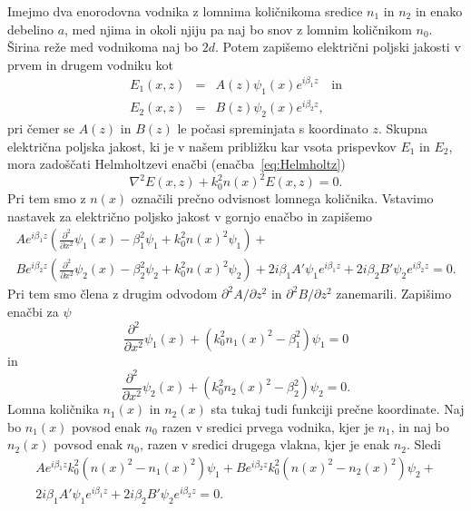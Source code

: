 Imejmo dva enorodovna vodnika z lomnima količnikoma sredice $n_1$ in $n_2$ in enako 
debelino $a$, med njima in okoli njiju pa naj bo snov z lomnim količnikom $n_0$. Širina 
reže med vodnikoma naj bo $2d$.
Potem zapišemo električni poljski jakosti v prvem in drugem vodniku kot
\begin{eqnarray}
E_1(x,z) &=& A(z) \psi_1(x) e^{i \beta_1 z} \quad \mathrm{in}\\
E_2(x,z) &=& B(z) \psi_2(x) e^{i \beta_2 z},
\label{eq:10_ampl}
\end{eqnarray}
pri čemer se $A(z)$ in $B(z)$ le počasi spreminjata s koordinato $z$. Skupna električna poljska
jakost, ki je v našem približku kar vsota prispevkov $E_1$ in $E_2$, 
mora zadoščati Helmholtzevi enačbi
(enačba~\ref{eq:Helmholtz})
\begin{equation}
\nabla^{2}E(x,z)+k_0^{2}n(x)^2 E(x,z) =0.
\end{equation}
Pri tem smo z $n(x)$ označili prečno odvisnost lomnega količnika.
Vstavimo nastavek za električno poljsko jakost v gornjo enačbo in zapišemo
\begin{multline}
A e^{i \beta_1 z}\left(\frac{\partial^2}{\partial x^2}\psi_1(x) - \beta_1^2\psi_1 + k_0^2
n(x)^2 \psi_1 \right)
+ \\
B e^{i \beta_2 z}\left(\frac{\partial^2}{\partial x^2}\psi_2(x) - \beta_2^2\psi_2 + k_0^2
n(x)^2 \psi_2 \right)+ 2 i \beta_1 A' \psi_1 e^{i \beta_1 z}+
2 i \beta_2 B' \psi_2 e^{i \beta_2 z} = 0.
\end{multline}
Pri tem smo člena z drugim odvodom $\partial^2 A/\partial z^2$ in $\partial^2 B/\partial z^2$
zanemarili. Zapišimo enačbi za $\psi$
\begin{equation}
\frac{\partial^2}{\partial x^2}\psi_1(x) + \left(k_0^2n_1(x)^2-\beta_1^2\right) \psi_1 =0
\end{equation}
in
\begin{equation}
 \frac{\partial^2}{\partial x^2}\psi_2(x) + \left(k_0^2n_2(x)^2-\beta_2^2\right) \psi_2 =0.
\end{equation}
Lomna količnika $n_1(x)$ in $n_2(x)$ sta tukaj tudi funkciji prečne koordinate. Naj bo $n_1(x)$  
povsod enak $n_0$ razen v sredici prvega vodnika, kjer je $n_1$, in naj bo 
$n_2(x)$ povsod enak $n_0$, razen v sredici drugega vlakna, kjer je enak $n_2$. Sledi
\begin{multline}
A e^{i \beta_1 z}k_0^2\left(n(x)^2 -n_1(x)^2\right)\psi_1 
+ 
B e^{i \beta_2 z}k_0^2\left(n(x)^2 -n_2(x)^2\right)\psi_2 + \\2 i \beta_1 A' \psi_1 e^{i \beta_1 z}+
2 i \beta_2 B' \psi_2 e^{i \beta_2 z} = 0.
\end{multline}
